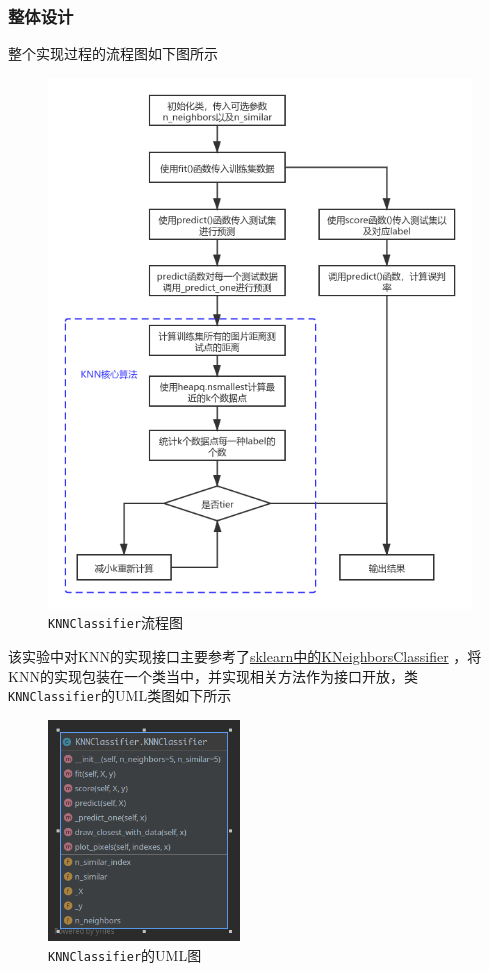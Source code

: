\documentclass[UTF8]{ctexart}
\begin{document}
\subsubsection{整体设计}
整个实现过程的流程图如下图所示
\begin{figure}[h]
    \centering
    \includegraphics[width=5in]{asset/流程图.png}
    \caption{\lstinline{KNNClassifier}流程图} %
\end{figure}



该实验中对KNN的实现接口主要参考了\href{https://scikit-learn.org/stable/modules/generated/sklearn.neighbors.KNeighborsClassifier.html}{sklearn中的KNeighborsClassifier}
，将KNN的实现包装在一个类当中，并实现相关方法作为接口开放，类 \lstinline{KNNClassifier}的UML类图如下所示

\begin{figure}[h]
    \centering
    \includegraphics[width=2in]{asset/KNNClassifier_UML.png}
    \caption{\lstinline{KNNClassifier}的UML图} %
\end{figure}
\end{document}
